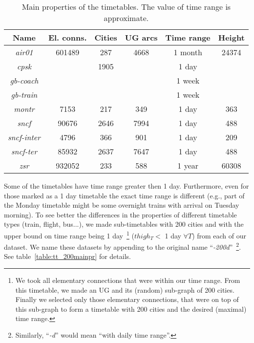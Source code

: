 	\begin{table}[h!]
		\centering
		\small
		\begin{tabular}{c|c|c|c|c|c}
			\rowcolor{tablehead}
			\textbf{Name} & \textbf{El. conns.} & \textbf{Cities} & \textbf{UG arcs} & \textbf{Time range} & \textbf{Height} \\
			\hline
			\textit{air01} & 601489 & 287 & 4668 & 1 month & 24374 \\
			\textit{cpsk} &  & 1905 &  & 1 day &  \\
			\textit{gb-coach} &  &  &  & 1 week &  \\
			\textit{gb-train} &  &  &  & 1 week &  \\
			\textit{montr} & 7153 & 217 & 349  & 1 day & 363 \\
			\textit{sncf} & 90676 & 2646 & 7994 & 1 day & 488 \\
			\textit{sncf-inter} & 4796 & 366 & 901 & 1 day & 209 \\
			\textit{sncf-ter} & 85932 & 2637 & 7647 & 1 day & 488 \\
			\textit{zsr} & 932052 & 233 & 588 & 1 year & 60308 \\
		\end{tabular}
		\caption{\label{table:tt_mainpr} Main properties of the timetables. The value of time range is approximate.}
		\normalsize
	\end{table}	
	
	\noindent Some of the timetables have time range greater then 1 day. Furthermore, even for those marked as a 1 day timetable the exact time range is different (e.g., part of the Monday timetable might be some overnight trains with arrival on Tuesday morning). To see better the differences in the properties of different timetable types (train, flight, bus...), we made sub-timetables with 200 cities and with the upper bound on time range being 1 day~\footnote{We took all elementary connections that were within our time range. From this timetable, we made an UG and its (random) sub-graph of 200 cities. Finally we selected only those elementary connections, that were on top of this sub-graph to form a timetable with 200 cities and the desired (maximal) time range.} ($thigh_{T} <$ 1 day $\forall T$) from each of our dataset. We name these datasets by appending to the original name ``\textit{-200d}''~\footnote{Similarly, ``\textit{-d}'' would mean ``with daily time range''.}. See table~\ref{table:tt_200mainpr} for details. \\
	
